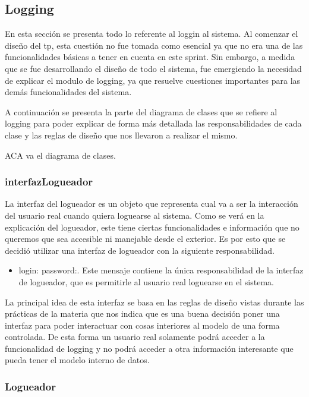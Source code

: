 \subsection{Logging}

En esta secci\'on se presenta todo lo referente al loggin al sistema. Al comenzar el diseño del tp, esta cuesti\'on no fue tomada como esencial ya que no era una de las funcionalidades b\'asicas a tener en cuenta en este sprint. Sin embargo, a medida que se fue desarrollando el diseño de todo el sistema, fue emergiendo la necesidad de explicar el modulo de logging, ya que resuelve cuestiones importantes para las dem\'as funcionalidades del sistema.

A continuaci\'on se presenta la parte del diagrama de clases que se refiere al logging para poder explicar de forma m\'as detallada las responsabilidades de cada clase y las reglas de diseño que nos llevaron a realizar el mismo.

ACA va el diagrama de clases.


\subsubsection{interfazLogueador}

La interfaz del logueador es un objeto que representa cual va a ser la interacci\'on del usuario real cuando quiera loguearse al sistema. Como se ver\'a en la explicaci\'on del logueador, este tiene ciertas funcionalidades e informaci\'on que no queremos que sea accesible ni manejable desde el exterior. Es por esto que se decidi\'o utilizar una interfaz de logueador con la siguiente responsabilidad.

\begin{itemize}
\item login: password:. Este mensaje contiene la \'unica responsabilidad de la interfaz de logueador, que es permitirle al usuario real loguearse en el sistema.
\end{itemize}

La principal idea de esta interfaz se basa en las reglas de diseño vistas durante las pr\'acticas de la materia que nos indica que es una buena decisi\'on poner una interfaz para poder interactuar con cosas interiores al modelo de una forma controlada. De esta forma un usuario real solamente podr\'a acceder a la funcionalidad de logging y no podr\'a acceder a otra informaci\'on interesante que pueda tener el modelo interno de datos. 

\subsubsection{Logueador}

